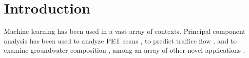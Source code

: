 \chapter{Introduction\label{ch:intro}}

Machine learning has been used in a vast array of contexts. Principal
component analysis has been used to analyze PET scans \cite{Functional
  Connectivity: The Principal-Component Analysis of Large (PET) Data
  Sets}, to predict traffice flow \cite{Forecasting Approach for
  Short-term Traffic Flow based on Principal Component Analysis and
  Combined Neural Network}, and to examine groundwater composition
\cite{Temporal evolution of groundwater composition in an alluvial
  aquifer (Pisuerga River, Spain) by principal component analysis},
among an array of other novel applications \cite{Principal component
  analysis of molecular dynamics: On the use of Cartesian vs. internal
  coordinates; Monitoring batch processes using multiway principal
  component analysis; Forecasting Using Principal Components From a
  Large Number of Predictors}. 













